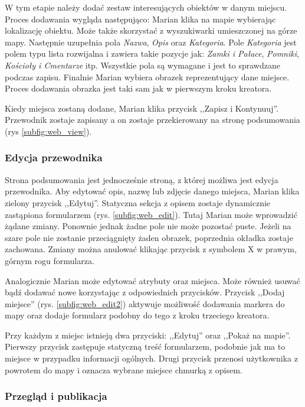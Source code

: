 \documentclass[a4paper]{book}
\begin{document}
			W tym etapie należy dodać zestaw interesujących obiektów w danym miejscu. Proces dodawania wygląda następująco: Marian klika na mapie wybierając lokalizację obiektu. Może także skorzystać z wyszukiwarki umieszczonej na górze mapy. Następnie uzupełnia pola \textit{Nazwa}, \textit{Opis} oraz \textit{Kategoria}. Pole \textit{Kategoria} jest polem typu lista rozwijalna i zawiera takie pozycje jak: \textit{Zamki i Pałace}, \textit{Pomniki}, \textit{Kościoły i Cmentarze} itp. Wszystkie pola są wymagane i jest to sprawdzane podczas zapisu.
			Finalnie Marian wybiera obrazek reprezentujący dane miejsce. Proces dodawania obrazka jest taki sam jak w pierwszym kroku kreatora.
			
			Kiedy miejsca zostaną dodane, Marian klika przycisk ,,Zapisz i Kontynuuj''. Przewodnik zostaje zapisany a on zostaje przekierowany na stronę podsumowania (rys \ref{subfig:web_view}).
			
			\subsubsection{Edycja przewodnika}
			
			Strona podsumowania jest jednocześnie stroną, z której możliwa jest edycja przewodnika. Aby edytować opis, nazwę lub zdjęcie danego miejsca, Marian klika zielony przycisk ,,Edytuj''. Statyczna sekcja z opisem zostaje dynamicznie zastąpiona formularzem (rys. \ref{subfig:web_edit}). Tutaj Marian może wprowadzić żądane zmiany. Ponownie jednak żadne pole nie może pozostać puste. Jeżeli na szare pole nie zostanie przeciągnięty żaden obrazek, poprzednia okładka zostaje zachowana. Zmiany można anulować klikając przycisk z symbolem X w prawym, górnym rogu formularza. 
			
			Analogicznie Marian może edytować atrybuty oraz miejsca. Może również usuwać bądź dodawać nowe korzystając z odpowiednich przycisków. Przycisk ,,Dodaj miejsce'' (rys. \ref{subfig:web_edit2}) aktywuje możliwość dodawania markera do mapy oraz dodaje formularz podobny do tego z kroku trzeciego kreatora. 
			
			Przy każdym z miejsc istnieją dwa przyciski: ,,Edytuj'' oraz ,,Pokaż na mapie''. Pierwszy przycisk zastępuje statyczną treść formularzem, podobnie jak ma to miejsce w przypadku informacji ogólnych. Drugi przycisk przenosi użytkownika z powrotem do mapy i oznacza wybrane miejsce chmurką z opisem. 
			
			\subsubsection{Przegląd i publikacja}
		
\end{document}
